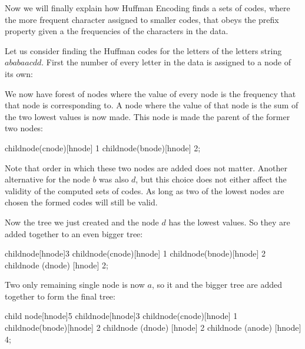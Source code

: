 Now we will finally explain how Huffman Encoding finds a sets of
codes, where the more frequent character assigned to smaller codes,
that obeys the prefix property given a the frequencies of the
characters in the data.

Let us consider finding the Huffman codes for the letters of the
letters string $ababaacdd$. First the number of every letter in the
data is assigned to a node of its own:

\begin{huffmanc}
\end{huffmanc}

We now have forest of nodes where the value of every node is the
frequency that that node is corresponding to. A node where the value
of that node is the sum of the two lowest values is now made. This
node is made the parent of the former two nodes:

\begin{huffmanc}
  child{node(cnode)[hnode] {1}}
  child{node(bnode)[hnode] {2}};
\end{huffmanc}

Note that order in which these two nodes are added does not
matter. Another alternative for the node $b$ was also $d$, but this
choice does not either affect the validity of the computed sets of
codes. As long as two of the lowest nodes are chosen the formed codes
will still be valid.

Now the tree we just created and the node $d$ has the lowest
values. So they are added together to an even bigger tree:

\begin{huffmanc}
  child{node[hnode]{3}
  child{node(cnode)[hnode] {1}}
  child{node(bnode)[hnode] {2}}}
  child{node (dnode) [hnode] {2}};


\end{huffmanc}

Two only remaining single node is now $a$, so it and the bigger tree
are added together to form the final tree:

\begin{huffmanc}

  child {node[hnode]{5}
  child{node[hnode]{3}
  child{node(cnode)[hnode] {1}}
  child{node(bnode)[hnode] {2}}}
  child{node (dnode) [hnode] {2}}}
  child{node (anode) [hnode] {4}};


\end{huffmanc}

